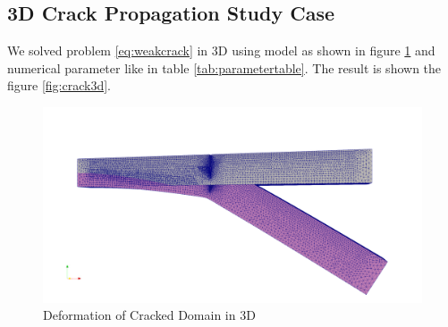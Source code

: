 \documentclass[a4paper,11pt]{article}
\begin{document}
\subsection{3D Crack Propagation Study Case}
We solved problem \eqref{eq:weakcrack} in 3D using model as shown in figure \ref{fig:3dcrack-mesh} and numerical parameter like in table \ref{tab:parametertable}. The result is shown the figure \ref{fig:crack3d}.
\begin{figure}[h!]
	\centering
	\includegraphics[width=0.7\linewidth]{picture/conference/3dcrack-mesh}
	\caption{Deformation of Cracked Domain in 3D}
	\label{fig:3dcrack-mesh}
\end{figure}
\end{document}
